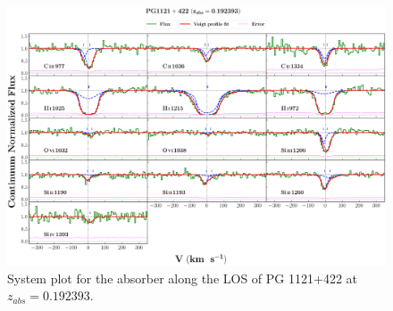   
  
  \newpage
  
  \begin{landscape}
  
  \begin{figure}
      \centering
      \vspace{-20mm}
      \hspace*{-35mm}
      \includegraphics[width=1.25\linewidth]{System-Plots/PG1121+422_z=0.192393_sys_plot.png}
      \caption{System plot for the absorber along the LOS of PG 1121+422 at $z_{abs} = 0.192393$. }
  \end{figure}
  
  \end{landscape}
  
